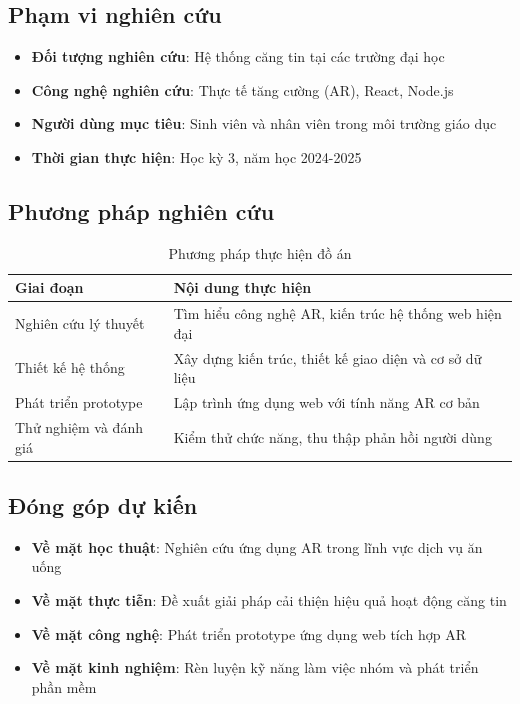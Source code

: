 \documentclass[12pt,a4paper]{article}
\begin{document}
\subsection*{Phạm vi nghiên cứu}
\begin{itemize}[leftmargin=1cm]
    \item \textbf{Đối tượng nghiên cứu}: Hệ thống căng tin tại các trường đại học
    \item \textbf{Công nghệ nghiên cứu}: Thực tế tăng cường (AR), React, Node.js
    \item \textbf{Người dùng mục tiêu}: Sinh viên và nhân viên trong môi trường giáo dục
    \item \textbf{Thời gian thực hiện}: Học kỳ 3, năm học 2024-2025
\end{itemize}

\subsection*{Phương pháp nghiên cứu}
\begin{table}[H]
\centering
\begin{tabular}{@{}lp{8cm}@{}}
\toprule
\textbf{Giai đoạn} & \textbf{Nội dung thực hiện} \\
\midrule
Nghiên cứu lý thuyết & Tìm hiểu công nghệ AR, kiến trúc hệ thống web hiện đại \\
Thiết kế hệ thống & Xây dựng kiến trúc, thiết kế giao diện và cơ sở dữ liệu \\
Phát triển prototype & Lập trình ứng dụng web với tính năng AR cơ bản \\
Thử nghiệm và đánh giá & Kiểm thử chức năng, thu thập phản hồi người dùng \\
\bottomrule
\end{tabular}
\caption{Phương pháp thực hiện đồ án}
\end{table}

\subsection*{Đóng góp dự kiến}
\begin{itemize}[leftmargin=1cm]
    \item \textbf{Về mặt học thuật}: Nghiên cứu ứng dụng AR trong lĩnh vực dịch vụ ăn uống
    \item \textbf{Về mặt thực tiễn}: Đề xuất giải pháp cải thiện hiệu quả hoạt động căng tin
    \item \textbf{Về mặt công nghệ}: Phát triển prototype ứng dụng web tích hợp AR
    \item \textbf{Về mặt kinh nghiệm}: Rèn luyện kỹ năng làm việc nhóm và phát triển phần mềm
\end{itemize}
\end{document}
